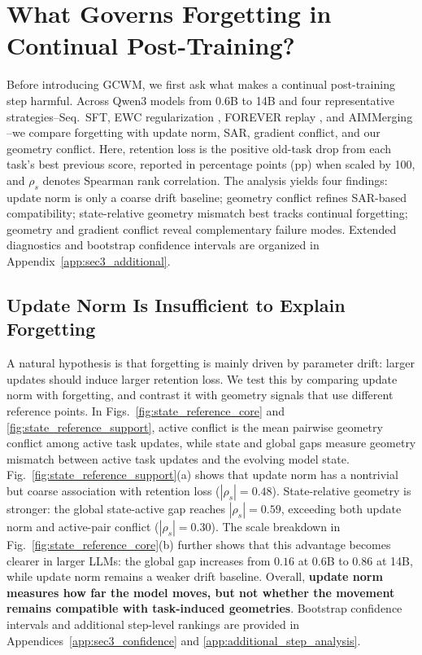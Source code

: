 \documentclass{article}
\begin{document}
\section{What Governs Forgetting in Continual Post-Training?}
\label{sec:findings}
Before introducing GCWM, we first ask what makes a continual post-training step harmful.
Across Qwen3 models \cite{yang2025qwen3} from 0.6B to 14B and four representative strategies--Seq.\ SFT, EWC regularization \cite{kirkpatrick2017overcoming}, FOREVER replay \cite{feng2026forever}, and AIMMerging \cite{feng2025aimmerging}--we compare forgetting with update norm, SAR, gradient conflict, and our geometry conflict.
Here, retention loss is the positive old-task drop from each task's best previous score, reported in percentage points (pp) when scaled by 100, and \(\rho_s\) denotes Spearman rank correlation.
The analysis yields four findings: update norm is only a coarse drift baseline; geometry conflict refines SAR-based compatibility; state-relative geometry mismatch best tracks continual forgetting; geometry and gradient conflict reveal complementary failure modes. Extended diagnostics and bootstrap confidence intervals are organized in Appendix~\ref{app:sec3_additional}.




\subsection{Update Norm Is Insufficient to Explain Forgetting}
\label{sec:update_norm}



A natural hypothesis is that forgetting is mainly driven by parameter drift: larger updates should induce larger retention loss.
We test this by comparing update norm with forgetting, and contrast it with geometry signals that use different reference points.
In Figs.~\ref{fig:state_reference_core} and \ref{fig:state_reference_support}, active conflict is the mean pairwise geometry conflict among active task updates, while state and global gaps measure geometry mismatch between active task updates and the evolving model state.
Fig.~\ref{fig:state_reference_support}(a) shows that update norm has a nontrivial but coarse association with retention loss (\(|\rho_s|=0.48\)).
State-relative geometry is stronger: the global state-active gap reaches \(|\rho_s|=0.59\), exceeding both update norm and active-pair conflict (\(|\rho_s|=0.30\)).
The scale breakdown in Fig.~\ref{fig:state_reference_core}(b) further shows that this advantage becomes clearer in larger LLMs: the global gap increases from \(0.16\) at 0.6B to \(0.86\) at 14B, while update norm remains a weaker drift baseline.
Overall, \textbf{update norm measures how far the model moves, but not whether the movement remains compatible with task-induced geometries}. Bootstrap confidence intervals and additional step-level rankings are provided in Appendices~\ref{app:sec3_confidence} and \ref{app:additional_step_analysis}.
\end{document}
